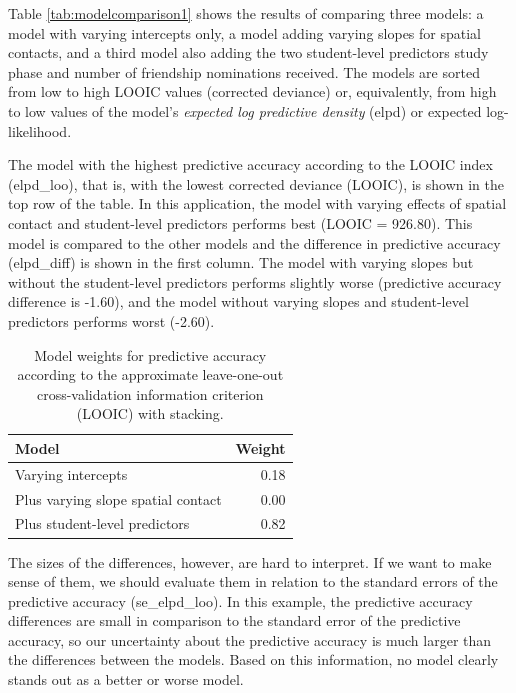 \documentclass[doc]{apa6}
\begin{document}
Table \ref{tab:modelcomparison1} shows the results of comparing three
models: a model with varying intercepts only, a model adding varying
slopes for spatial contacts, and a third model also adding the two
student-level predictors study phase and number of friendship
nominations received. The models are sorted from low to high LOOIC
values (corrected deviance) or, equivalently, from high to low values of
the model's \emph{expected log predictive density} (elpd) or expected
log-likelihood.

The model with the highest predictive accuracy according to the LOOIC
index (elpd\_loo), that is, with the lowest corrected deviance (LOOIC),
is shown in the top row of the table. In this application, the model
with varying effects of spatial contact and student-level predictors
performs best (LOOIC = 926.80). This model is compared to the other
models and the difference in predictive accuracy (elpd\_diff) is shown
in the first column. The model with varying slopes but without the
student-level predictors performs slightly worse (predictive accuracy
difference is -1.60), and the model without varying slopes and
student-level predictors performs worst (-2.60).

\begin{table}

\caption{\label{tab:modelcomparison2}Model weights for predictive accuracy according to the approximate leave-one-out cross-validation information criterion (LOOIC) with stacking.}
\centering
\fontsize{12}{14}\selectfont
\begin{tabular}[t]{lr}
\toprule
Model & Weight\\
\midrule
Varying intercepts & 0.18\\
Plus varying slope spatial contact & 0.00\\
Plus student-level predictors & 0.82\\
\bottomrule
\end{tabular}
\end{table}

The sizes of the differences, however, are hard to interpret. If we want
to make sense of them, we should evaluate them in relation to the
standard errors of the predictive accuracy (se\_elpd\_loo). In this
example, the predictive accuracy differences are small in comparison to
the standard error of the predictive accuracy, so our uncertainty about
the predictive accuracy is much larger than the differences between the
models. Based on this information, no model clearly stands out as a
better or worse model.
\end{document}

